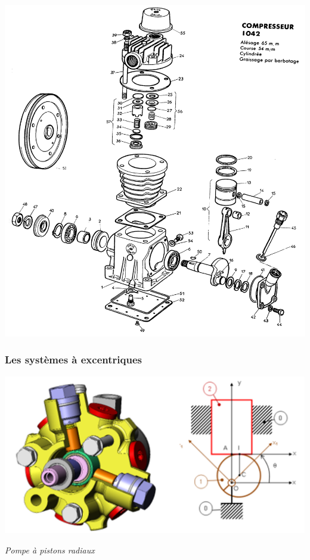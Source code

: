 \documentclass[11pt,oneside]{article}
\begin{document}
\begin{minipage}[c]{.5\linewidth}
\begin{center}
\includegraphics[width=.9\textwidth]{png/fig_114}
\end{center}
\end{minipage}

\subsubsection{Les systèmes à excentriques}

\begin{center}
\includegraphics[width=.8\textwidth]{png/fig_115}

\textit{Pompe à pistons radiaux}
\end{center}
\end{document}
